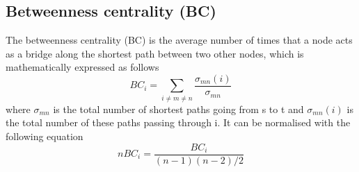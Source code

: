 \documentclass[twocolumn]{article}
\begin{document}
	\subsection*{Betweenness centrality (BC)}
		The betweenness centrality (BC) is the average number of times that a node acts as a bridge along the shortest path between two other nodes, which is mathematically expressed as follows \citep{Wasserman1994}
		\begin{equation}
			BC_i=\sum_{i\neq m\neq n}\frac{\sigma_{mn}\left(i\right)}{\sigma_{mn}}
		\end{equation}
		where $\sigma_{mn}$ is the total number of shortest paths going from s to t and $\sigma_{mn}\left(i\right)$ is the total number of these paths passing through i.
		It can be normalised with the following equation \citep{Wasserman1994}
		\begin{equation}
			nBC_i=\frac{BC_i}{\left(n-1\right)\left(n-2\right)/2}
		\end{equation}
\end{document}
